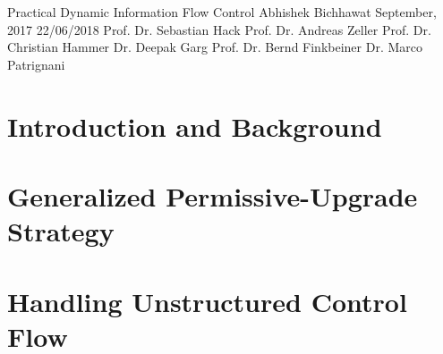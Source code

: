 \documentclass[a4paper,10pt,twoside,openright]{book}
\begin{document}
\frontmatter

\ThesisTitle
    {Practical Dynamic Information Flow Control} %
    {Abhishek Bichhawat}               %
    {September, 2017}                  %
    {22/06/2018}	 %
    {Prof. Dr. Sebastian Hack}		%
    {Prof. Dr. Andreas Zeller}		%
    {Prof. Dr. Christian Hammer}                %
    {Dr. Deepak Garg}            %
    {Prof. Dr. Bernd Finkbeiner}						%
    {Dr. Marco Patrignani}						%




\pagestyle{empty}
\cleardoublepage

\cleardoublepage

% 
\cleardoublepage


\cleardoublepage


\pagestyle{fancyplain} %
\tableofcontents
{}


\mainmatter\setcounter{page}{1}

\cleardoublepage
\part{Introduction and Background}
\cleardoublepage


% 

\cleardoublepage
\part{Generalized Permissive-Upgrade Strategy}
\cleardoublepage



\cleardoublepage
\part{Handling Unstructured Control Flow} 
\cleardoublepage


\cleardoublepage
\end{document}
